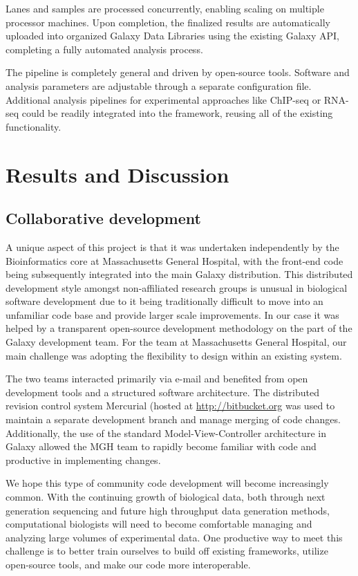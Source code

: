 \documentclass[10pt]{bmc_article}
\newenvironment{bmcformat}{\begin{raggedright}\baselineskip20pt\sloppy\setboolean{publ}{false}}{\end{raggedright}\baselineskip20pt\sloppy}
\begin{document}
\begin{bmcformat}
Lanes and samples are processed concurrently, enabling scaling on
multiple processor machines. Upon completion, the finalized results are
automatically uploaded into organized Galaxy Data Libraries using the
existing Galaxy API, completing a fully automated analysis process.

The pipeline is completely general and driven by open-source
tools. Software and analysis parameters are adjustable through a
separate configuration file. Additional analysis pipelines for
experimental approaches like ChIP-seq or RNA-seq could be readily
integrated into the framework, reusing all of the existing
functionality.

\section*{Results and Discussion}

\subsection*{Collaborative development}

A unique aspect of this project is that it was undertaken
independently by the Bioinformatics core at Massachusetts General
Hospital, with the front-end code being subsequently integrated
into the main Galaxy distribution. This distributed development style
amongst non-affiliated research groups is unusual in biological software
development due to it being traditionally difficult to move into an
unfamiliar code base and provide larger scale improvements. In our
case it was helped by a transparent open-source development
methodology on the part of the Galaxy development team. For the team
at Massachusetts General Hospital, our main challenge was adopting
the flexibility to design within an existing system.

The two teams interacted primarily via e-mail and benefited from open
development tools and a structured software architecture. The
distributed revision control system Mercurial (hosted at
\url{http://bitbucket.org} was used to maintain a separate development
branch and manage merging of code changes. Additionally, the use of
the standard Model-View-Controller architecture in Galaxy allowed the
MGH team to rapidly become familiar with code and productive in
implementing changes.

We hope this type of community code development will become
increasingly common. With the continuing growth of biological data,
both through next generation sequencing and future high throughput
data generation methods, computational biologists will need to become
comfortable managing and analyzing large volumes of experimental
data. One productive way to meet this challenge is to better train
ourselves to build off existing frameworks, utilize open-source tools,
and make our code more interoperable.


\end{bmcformat}
\end{document}
